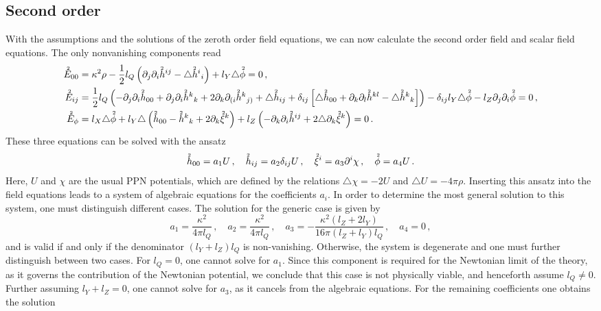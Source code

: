 \documentclass[notitlepage,a4paper,aps,prd,onecolumn,superscriptaddress,nofootinbib,groupedaddress,longbibliography]{revtex4-2}
\newcommand{\order}[2]{\accentset{#2}{#1}}
\begin{document}
\subsection{Second order}\label{ssec:order2}
With the assumptions and the solutions of the zeroth order field equations, we can now calculate the second order field and scalar field equations. The only nonvanishing components read
\begin{align}
\order{E}{2}_{00} &=\kappa^2\rho-\frac{1}{2}l_Q\left(\partial_j\partial_i\order{h}{2}^{ij}-\triangle\order{h}{2}^i{}_i\right)+l_Y\triangle\order{\phi}{2}=0\,,\nonumber\\
\order{E}{2}_{ij} &= \frac{1}{2}l_Q\left(-\partial_j\partial_i\order{h}{2}_{00}+\partial_j\partial_i\order{h}{2}^k{}_{k}+2\partial_{k}\partial_{(i}\order{h}{2}^k{}_{j)}+\triangle\order{h}{2}_{ij}+\delta_{ij}\left[\triangle\order{h}{2}_{00}+\partial_k\partial_l\order{h}{2}^{kl}-\triangle\order{h}{2}^k{}_{k}\right]\right)-\delta_{ij} l_Y\triangle\order{\phi}{2}-l_Z\partial_j\partial_i\order{\phi}{2}=0\,,\nonumber\\
\order{E}{2}_{\phi} &= l_X\triangle\order{\phi}{2}+l_Y\triangle\left(\order{h}{2}_{00}-\order{h}{2}^{k}{}_k+2\partial_k\order{\xi}{2}^k\right)+l_Z\left(-\partial_k\partial_i\order{h}{2}^{ij}+2\triangle\partial_k\order{\xi}{2}^k\right)=0\,.
\end{align}
These three equations can be solved with the ansatz
\begin{equation}
\order{h}{2}_{00} =a_1U\,, \quad
\order{h}{2}_{ij} = a_2\delta_{ij}U\,, \quad
\order{\xi}{2}^{i} = a_3\partial^i\chi\,, \quad
\order{\phi}{2} =a_4U\,.
\end{equation}
Here, $U$ and $\chi$ are the usual PPN potentials, which are defined by the relations $\triangle\chi=-2U$ and \(\triangle U = -4\pi\rho\). Inserting this ansatz into the field equations leads to a system of algebraic equations for the coefficients $a_i$. In order to determine the most general solution to this system, one must distinguish different cases. The solution for the generic case is given by
\begin{equation}
a_1 =\frac{\kappa^2}{4\pi l_Q} \,, \quad
a_2 =\frac{\kappa^2}{4\pi l_Q} \,, \quad
a_3 = -\frac{\kappa^2\left(l_Z+2l_Y\right)}{16\pi\left(l_Z+l_Y\right)l_Q}\,, \quad
a_4 = 0 \,,
\end{equation}
and is valid if and only if the denominator \((l_Y + l_Z)l_Q\) is non-vanishing. Otherwise, the system is degenerate and one must further distinguish between two cases. For \(l_Q = 0\), one cannot solve for \(a_1\). Since this component is required for the Newtonian limit of the theory, as it governs the contribution of the Newtonian potential, we conclude that this case is not physically viable, and henceforth assume \(l_Q \neq 0\). Further assuming \(l_Y + l_Z = 0\), one cannot solve for \(a_3\), as it cancels from the algebraic equations. For the remaining coefficients one obtains the solution
\end{document}
